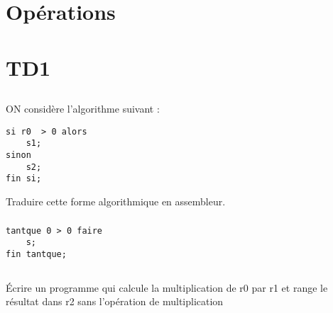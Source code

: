 \documentclass[12pt,a4paper,openany]{book}
\begin{document}
	\setcounter{tocdepth}{2}
	\setcounter{secnumdepth}{3}
	\maketitle
	\tableofcontents
	\chapter{Opérations}
	
	

	

	
	
	
	\chapter{TD1}
	\section{}
\subsection{}
	ON considère l'algorithme suivant : 
\begin{lstlisting}[language=Algo]
si r0  > 0 alors
	s1;
sinon
	s2;
fin si;
\end{lstlisting}
Traduire cette forme algorithmique en assembleur.

\subsection{}
\begin{lstlisting}[language=Algo]
tantque 0 > 0 faire
	s;
fin tantque;
\end{lstlisting}


\section{}
\subsection{}


\subsection{}
\'Ecrire un programme qui calcule la multiplication de r0 par r1 et range le résultat dans r2 sans l'opération de multiplication

\end{document}
